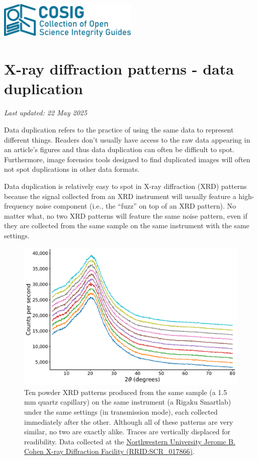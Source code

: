 \documentclass[letterpaper, 12pt]{article}
\begin{document}
\flushleft
\includegraphics[width=0.5\textwidth]{img/home/241017_final_logo_mockup.png}

\section*{X-ray diffraction patterns - data duplication}
\textit{Last updated: 22 May 2025}

Data duplication refers to the practice of using the same data to represent different things. Readers don't usually have access to the raw data appearing in an article's figures and thus data duplication can often be difficult to spot. Furthermore, image forensics tools designed to find duplicated images will often not spot duplications in other data formats.

Data duplication is relatively easy to spot in X-ray diffraction (XRD) patterns because the signal collected from an XRD instrument will usually feature a high-frequency noise component (i.e., the ``fuzz'' on top of an XRD pattern). No matter what, no two XRD patterns will feature the same noise pattern, even if they are collected from the same sample on the same instrument with the same settings.

\begin{figure}[h!tbp]
    \centering
    \includegraphics[width=\textwidth]{img/xrd_data_duplication/250519_xrd_x10.pdf}
    \caption*{Ten powder XRD patterns produced from the same sample (a 1.5 mm quartz capillary) on the same instrument (a Rigaku Smartlab) under the same settings (in transmission mode), each collected immediately after the other. Although all of these patterns are very similar, no two are exactly alike. Traces are vertically displaced for readibility. Data collected at the \href{https://www.xray.facilities.northwestern.edu/}{Northwestern University Jerome B. Cohen X-ray Diffraction Facility (RRID:SCR\_017866)}.}
\end{figure}
\end{document}
